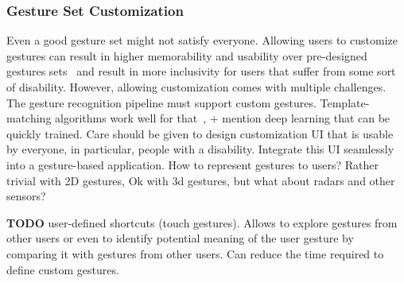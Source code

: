 










\subsubsection{Gesture Set Customization}
Even a good gesture set might not satisfy everyone. Allowing users to customize gestures can result in higher memorability and usability over pre-designed gestures sets~\cite{Oh:2013,Nacenta:2013} and result in more inclusivity for users that suffer from some sort of disability.
% 
However, allowing customization comes with multiple challenges.
The gesture recognition pipeline must support custom gestures. Template-matching algorithms work well for that~\cite{TODO}, + mention deep learning that can be quickly trained.
Care should be given to design customization UI that is usable by everyone, in particular, people with a disability. Integrate this UI seamlessly into a gesture-based application.
How to represent gestures to users? Rather trivial with 2D gestures, Ok with 3d gestures, but what about radars and other sensors?

\textbf{TODO} %
%
\cite{Ouyang:2012} user-defined shortcuts (touch gestures). Allows to explore gestures from other users or even to identify potential meaning of the user gesture by comparing it with gestures from other users. Can reduce the time required to define custom gestures.
%
\cite{Xu:2022}

